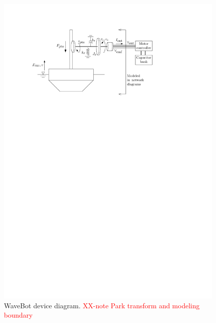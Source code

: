 \documentclass[lettersize,journal]{IEEEtran}
\newcommand{\rc}[1]{\textcolor{red}{#1}}
\begin{document}
\begin{figure}[tb]
        \centering
        \includegraphics[width=1\columnwidth]{wec_as_multiport_phyiscal_diagram.pdf}
        \caption{WaveBot device diagram. \rc{XX-note Park transform and modeling boundary}}
        \label{fig:wec_as_multiport_phyiscal_diagram}
\end{figure}
\end{document}
